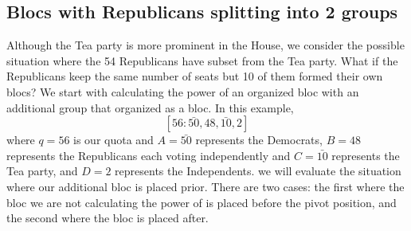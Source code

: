 \documentclass[12pt]{article}
\begin{document}
\subsection{Blocs with Republicans splitting into 2 groups}
Although the Tea party is more prominent in the House, we consider the possible situation where the 54 Republicans have subset from the Tea party. What if the Republicans keep the same number of seats but 10 of them formed their own blocs? We start with calculating the power of an organized bloc with an additional group that organized as a bloc. In this example, $$[56:\bar{50}, 48,\bar{10},2]$$
where $q= 56$ is our quota and $A=\bar{50}$ represents the Democrats, $B=48$ represents the Republicans each voting independently and $C=\bar{10}$ represents the Tea party, and $D=2$ represents the Independents. 
we will evaluate the situation where our additional bloc is placed prior. There are two cases: the first where the bloc we are not calculating the power of is placed before the pivot position, and the second where the bloc is placed after.
\end{document}

